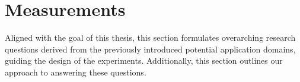 



\section{Measurements} %
\label{sec:Measurements}
Aligned with the goal of this thesis, this section formulates overarching
    research questions derived from the previously introduced potential
    application domains, guiding the design of the experiments.
Additionally, this section outlines our approach to answering these questions.

